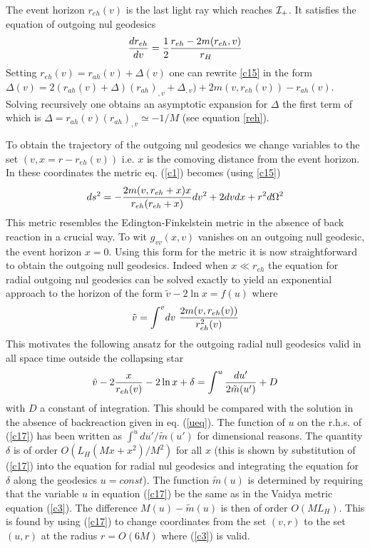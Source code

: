\documentclass[12pt,oneside]{report}
\begin{document}
The event horizon $r_{eh}(v)$ is the last light ray which
reaches ${\cal I}_+$. It satisfies the equation of
outgoing nul geodesics
\begin{equation}
{dr_{eh} \over dv} = {1 \over 2} { r_{eh} - 2 m(r_{eh}, v)
\over r_H}
\label{c15}
\end{equation}
Setting $r_{eh} (v) = r_{ah}(v) + \Delta(v)$ one can rewrite
\ref{c15} in the form $\Delta(v) = 2(r_{ah}(v) + \Delta) (r_{ah})_{,v} +
\Delta_{,v}) + 2m(v, r_{eh} (v)) - r_{ah}(v)$. Solving recursively one
obtains an asymptotic expansion for $\Delta$ the first term of
which is $\Delta = r_{ah}(v) (r_{ah})_{,v} \simeq -1/M$ 
(see equation \ref{reh}). 

To obtain the trajectory of the outgoing nul geodesics we change
variables to the set $(v, x = r - r_{eh}(v))$ i.e. $x$ is the 
comoving distance from the
event horizon. In these coordinates the metric eq. (\ref{c1})
becomes
(using \ref{c15})
\begin{equation}
ds^2 = - {2 m(v,r_{eh} + x) x\over r_{eh}(r_{eh} + x)} dv^2
+ 2 dv dx + r^2 d\Omega^2
\label{c16}
\end{equation}
This metric resembles the Edington-Finkelstein metric in the absence of back
reaction in a crucial way. To wit $g_{vv}(x,v)$ vanishes on an outgoing null
geodesic, the event horizon $x=0$. Using this form for the metric it is now
straightforward to obtain the outgoing null geodesics. Indeed
when $x \ll r_{eh}$  the
equation for radial outgoing nul geodesics can be solved exactly to
yield an exponential approach to the horizon of the form
$\tilde 
v - 2 \ln x = f(u)$ where
\begin{equation} \tilde v = \int^v\!dv\
{2m(v,r_{eh}(v))\over r_{eh}^2(v)} \label{c18}\end{equation}
This motivates the following ansatz for the outgoing radial null
geodesics valid in all space time outside the collapsing star
\begin{eqnarray} \tilde 
v - 2 {x\over r_{eh}(v)} -2  \ln x 
+ \delta = \int ^u{du'\over 2 \tilde m(u')} + D
\label{c17}\end{eqnarray}
with $D$ a constant of integration.
This should be compared with the solution in the absence of
backreaction given in eq. (\ref{ueq}).
The function of $u$ on the r.h.s. of (\ref{c17})
has been written as $\int^u du'/\tilde m(u')$ for dimensional reasons. The quantity
$\delta$ is of order  $O(  L_H (Mx+ x^2) / M^2)$ for all $x$ (this is shown by
substitution of (\ref{c17}) into the equation for radial nul geodesics and
integrating the equation for $\delta$ along the geodesics $u=const$). The
function $\tilde m (u)$ is determined by requiring that the variable $u$ in
equation (\ref{c17}) be the same as  in the Vaidya metric equation (\ref{c3}).
The difference $M(u)-\tilde m(u)$ is then of order $O(M L_H)$. This is found by
using (\ref{c17}) to change coordinates from the set $(v,r)$ to the set
$(u,r)$ at the radius $r=O(6M)$ where (\ref{c3}) is valid. 
\end{document}
